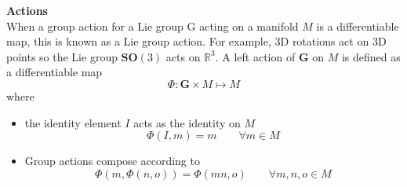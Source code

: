 		\textbf{Actions}\\
			When a group action for a Lie group G acting on a manifold $M$ is a differentiable map, this is known as a Lie group action. For example, 3D rotations act on 3D points so the Lie group $\mathbf{SO}(3)$ acts on $\mathbb{R}^3$. A left action of $\mathbf{G}$ on $M$ is defined as a differentiable map
			\begin{equation}
				\Phi: \mathbf{G} \times M \mapsto M
			\end{equation}
			where
			\begin{itemize}
			\item the identity element $I$ acts as the identity on $M$
				\begin{equation}
					\Phi(I,m) = m \hspace{2em} \forall m \in M
				\end{equation}
			\item Group actions compose according to
				\begin{equation}
					\Phi(m,\Phi(n,o)) = \Phi(mn,o) \hspace{2em} \forall m,n,o \in M
				\end{equation}
			\end{itemize}
		
		\begin{comment}	
		\textbf{Adjoint map}\\		
		EXPLANATION???\\
		For $A \in \mathbf{G}$ and $B \in ?$ define a function $\Psi$, known as the adjoint map of $\mathbf{G}$:
		\begin{equation}
			\Psi_A: \mathbf{G} \rightarrow \mathbf{G} \textnormal{, }
			\Psi_A(B) \stackrel{\Delta}{=} ABA^{-1}
		\end{equation}
		Taking the derivative:
		\begin{equation}
			\frac{\partial}{\partial t} \Psi_A(B(t))|_{t=0} = AVA^{-1} \textnormal{, }
			V \stackrel{\Delta}{=} 	\frac{\partial}{\partial t}B(t)|_{t=0}
		\end{equation}
		The adjoint	representation of $\mathbf{G}$ is given by the mapping
		\begin{equation}
			\textbf{Adj}_A: \mathfrak{g} \rightarrow \mathfrak{g} \textnormal{, }
			\textbf{Adj}_A(V) \stackrel{\Delta}{=} AVA^{-1}
		\end{equation}
		\end{comment}
		
